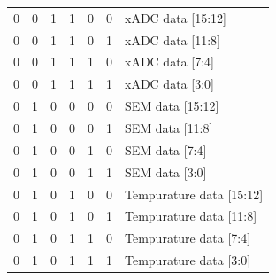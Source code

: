 \begin{table}[]
\begin{tabular}{|cccccc|l|}
    \multicolumn{1}{|c}{0} & 0                      & 1                      & 1                      & 0                      & 0 & xADC data {[}15:12{]}                  \\  
    \multicolumn{1}{|c}{0} & 0                      & 1                      & 1                      & 0                      & 1 & xADC data {[}11:8{]}                   \\  
    \multicolumn{1}{|c}{0} & 0                      & 1                      & 1                      & 1                      & 0 & xADC data {[}7:4{]}                    \\  
    \multicolumn{1}{|c}{0} & 0                      & 1                      & 1                      & 1                      & 1 & xADC data {[}3:0{]}                    \\  \hline
    \multicolumn{1}{|c}{0} & 1                      & 0                      & 0                      & 0                      & 0 & SEM data {[}15:12{]}                   \\  
    \multicolumn{1}{|c}{0} & 1                      & 0                      & 0                      & 0                      & 1 & SEM data {[}11:8{]}                    \\  
    \multicolumn{1}{|c}{0} & 1                      & 0                      & 0                      & 1                      & 0 & SEM data {[}7:4{]}                     \\  
    \multicolumn{1}{|c}{0} & 1                      & 0                      & 0                      & 1                      & 1 & SEM data {[}3:0{]}                     \\  \hline
    \multicolumn{1}{|c}{0} & 1                      & 0                      & 1                      & 0                      & 0 & Tempurature data {[}15:12{]}           \\  
    \multicolumn{1}{|c}{0} & 1                      & 0                      & 1                      & 0                      & 1 & Tempurature data {[}11:8{]}            \\  
    \multicolumn{1}{|c}{0} & 1                      & 0                      & 1                      & 1                      & 0 & Tempurature data {[}7:4{]}             \\  
    \multicolumn{1}{|c}{0} & 1                      & 0                      & 1                      & 1                      & 1 & Tempurature data {[}3:0{]}             \\  \hline

\end{tabular}
\end{table}
